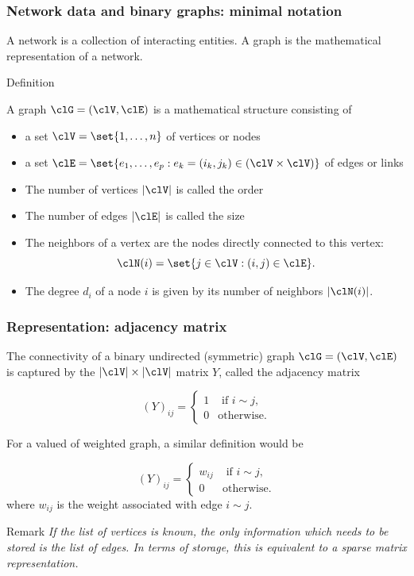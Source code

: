 \documentclass{beamer}\usepackage[]{graphicx}\usepackage[]{color}
\begin{document}
\begin{frame}
  \frametitle{Network data and binary graphs: minimal notation}

A \alert{network} is a collection of interacting entities. A \alert{graph} is the mathematical representation of a network.

\begin{block}{Definition}

A graph $\clG=(\clV,\clE)$ is a mathematical structure consisting of

  \begin{itemize}
    \item a set $\clV=\set{1,\dots,n}$ of \alert{vertices} or \alert{nodes} 
    \item a set $\clE=\set{e_1,\dots,e_p:e_k=(i_k,j_k)\in (\clV\times\clV)}$ of \alert{edges} or \alert{links} 
    \item The number of vertices $|\clV|$ is called the \alert{order}
    \item The number of edges $|\clE|$ is called the \alert{size}
    \item The neighbors of a vertex are the nodes directly connected to this vertex:
    \[
      \clN(i) = \set{j\in\clV : (i,j) \in \clE}.
    \]
    \item The degree $d_i$ of a node $i$ is given by its number of neighbors $|\clN(i)|$.
  \end{itemize}
\end{block}

\end{frame}

\begin{frame}
  \frametitle{Representation: adjacency matrix}

The connectivity of a binary undirected (symmetric) graph $\clG = (\clV,\clE)$ is captured by the $|\clV|\times |\clV|$ matrix $Y$, called the adjacency matrix

$$
  (Y)_{ij} = \begin{cases}
  1  & \text{ if } i \sim j,\\
  0  & \text{otherwise}.
\end{cases}
$$

For a valued of weighted graph, a similar definition would be

$$
  (Y)_{ij} = \begin{cases}
  w_{ij}  & \text{ if } i \sim j,\\
  0  & \text{otherwise}.
\end{cases}
$$
where $w_{ij}$ is the weight associated with edge $i\sim j$.

  \begin{block}{Remark}
    \it If the list of vertices is known, the only information which needs to be stored is the list of edges. In terms of storage, this is equivalent to a sparse matrix representation.
  \end{block}

\end{frame}
\end{document}
